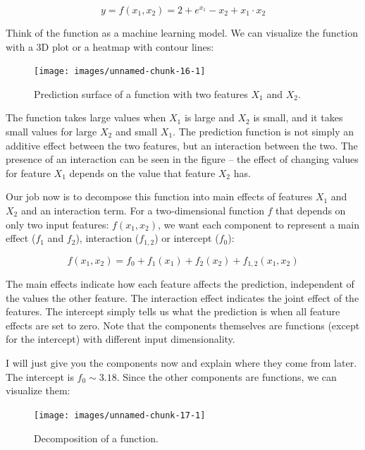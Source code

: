 \documentclass[
  12pt,
]{krantz}
\begin{document}
\[y = f(x_1, x_2) = 2 + e^{x_1} - x_2 + x_1 \cdot x_2\]

Think of the function as a machine learning model.
We can visualize the function with a 3D plot or a heatmap with contour lines:

\begin{figure}

{\centering \texttt{[image: images/unnamed-chunk-16-1]} 

}

\caption{Prediction surface of a function with two features $X_1$ and $X_2$.}\label{fig:unnamed-chunk-16}
\end{figure}

The function takes large values when \(X_1\) is large and \(X_2\) is small, and it takes small values for large \(X_2\) and small \(X_1\).
The prediction function is not simply an additive effect between the two features, but an interaction between the two.
The presence of an interaction can be seen in the figure -- the effect of changing values for feature \(X_1\) depends on the value that feature \(X_2\) has.

Our job now is to decompose this function into main effects of features \(X_1\) and \(X_2\) and an interaction term.
For a two-dimensional function \(f\) that depends on only two input features: \(f(x_1, x_2)\), we want each component to represent a main effect (\(f_1\) and \(f_2\)), interaction (\(f_{1,2}\)) or intercept (\(f_0\)):

\[f(x_1, x_2) = f_0 + f_1(x_1) + f_2(x_2) + f_{1,2}(x_{1},x_{2})\]

The main effects indicate how each feature affects the prediction, independent of the values the other feature.
The interaction effect indicates the joint effect of the features.
The intercept simply tells us what the prediction is when all feature effects are set to zero.
Note that the components themselves are functions (except for the intercept) with different input dimensionality.

I will just give you the components now and explain where they come from later.
The intercept is \(f_0\sim3.18\).
Since the other components are functions, we can visualize them:

\begin{figure}

{\centering \texttt{[image: images/unnamed-chunk-17-1]} 

}

\caption{Decomposition of a function.}\label{fig:unnamed-chunk-17}
\end{figure}
\end{document}

